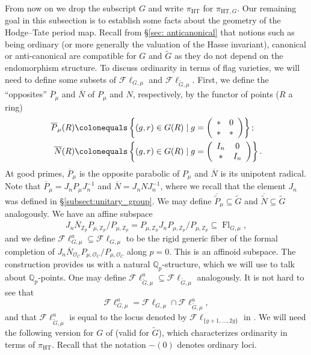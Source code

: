 \documentclass{amsart}
\theoremstyle{remark}
\numberwithin{equation}{subsection}
\newcommand{\Q}{\QQ}
\newcommand{\Z}{\ZZ}
\newcommand{\QQ}{{\mathbb Q}}
\newcommand{\ZZ}{{\mathbb Z}}
\newcommand{\cO}{{\mathcal O}}
\newcommand{\Zp}{\Z_p}
\newcommand{\Qp}{\Q_p}
\DeclareMathOperator{\Flr}{Fl}
\newcommand{\HT}{\mathrm{HT}}
\newcommand{\Fl}{\mathscr{F}\!\ell}
\newcommand{\tG}{\widetilde{G}}
\newcommand{\tN}{\widetilde{N}}
\newcommand{\tP}{\widetilde{P}}
\newcommand{\ol}{\overline}
\newcommand{\sub}{\subseteq}
\newcommand{\defeq}{\colonequals}
\renewcommand{\(}{\left(}
\renewcommand{\)}{\right)}
\begin{document}
From now on we drop the subscript $G$ and write $\pi_{\HT}$ for $\pi_{\HT,G}$. Our remaining goal in this subsection is to establish some facts about the geometry of the Hodge--Tate period map. Recall from \S \ref{sec: anticanonical} that notions such as being ordinary (or more generally the valuation of the Hasse invariant), canonical or anti-canonical are compatible for $G$ and $\tG$ as they do not depend on the endomorphism structure. To discuss ordinarity in terms of flag varieties, we will need to define some subsets of $\Fl_{G,\mu}$ and $\Fl_{\tG,\mu}$. First, we define the ``opposites'' $\ol{P}_\mu$ and $\ol{N}$ of $P_\mu$ and $N$, respectively, by the functor of points ($R$ a ring)
\begin{align*}
  \ol{P}_\mu(R) & \defeq \left\{(g,r)\in G(R) \mid g = \left(\begin{array}{cc} * & 0\\ * & * \end{array}\right) \right\}; \\
  \ol{N}(R) & \defeq \left\{(g,r)\in G(R) \mid g = \left(\begin{array}{cc} I_n  & 0 \\ * & I_n \end{array}\right) \right\}.
\end{align*}
At good primes, $\ol{P}_\mu$ is the opposite parabolic of $P_\mu$ and $\ol{N}$ is its unipotent radical. Note that $\ol{P}_\mu = J_n P_\mu J_n^{-1}$ and $\ol{N} = J_n N J_n^{-1}$, where we recall that the element $J_n$ was defined in \S \ref{subsect:unitary_group}. We may define $\ol{\tP}_\mu \sub \tG$ and $\ol{\tN} \sub \tG$ analogously. We have an affine subspace 
\[
  J_n \ol{N}_{\Zp}P_{\mu,\Zp}/P_{\mu,\Zp} = P_{\mu,\Zp}J_n P_{\mu,\Zp}/P_{\mu,\Zp} \sub \Flr_{G,\mu},
\]
and we define $\Fl_{G,\mu}^a \sub \Fl_{G,\mu}$ to be the rigid generic fiber of the formal completion of $J_n \ol{N}_{\cO_C}P_{\mu,\cO_C}/P_{\mu,\cO_C}$ along $p=0$. This is an affinoid subspace. The construction provides us with a natural $\Qp$-structure, which we will use to talk about $\Qp$-points. One may define $\Fl_{\tG,\mu}^a \sub \Fl_{\tG,\mu}$ analogously. It is not hard to see that
\[
\Fl_{G,\mu}^a = \Fl_{G,\mu} \cap \Fl_{\tG,\mu}^a, 
\]
and that $\Fl_{\tG,\mu}^a$ is equal to the locus denoted by $\Fl_{\{g+1,\dotsc,2g\}}$ in \cite[\S 3.3]{scholze-galois}. We will need the following version for $G$ of \cite[Lemmas 3.3.19 and 3.3.20]{scholze-galois} (valid for $\tG$), which characterizes ordinarity in terms of $\pi_{\HT}$. Recall that the notation $-(0)$ denotes ordinary loci.
\end{document}
